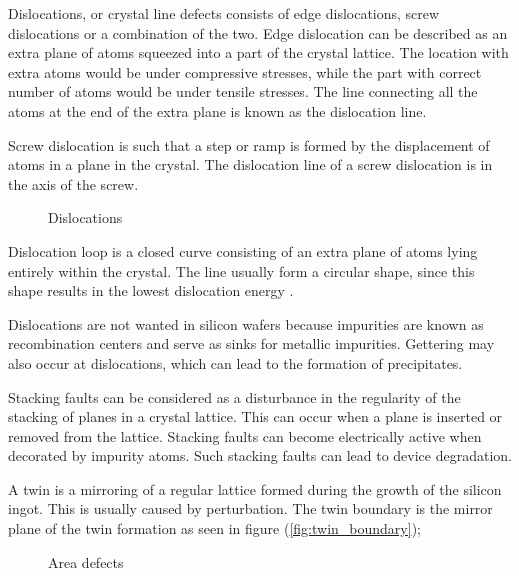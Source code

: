 Dislocations, or crystal line defects consists of edge dislocations, screw dislocations or a combination of the two. Edge dislocation can be described as an extra plane of atoms squeezed into a part of the crystal lattice. The location with extra atoms would be under compressive stresses, while the part with correct number of atoms would be under tensile stresses. The line connecting all the atoms at the end of the extra plane is known as the dislocation line.

Screw dislocation is such that a step or ramp is formed by the displacement of atoms in a plane in the crystal. The dislocation line of a screw dislocation is in the axis of the screw.


\begin{figure}[H]
\centering
{}
\label{fig:dislocations}
\caption{Dislocations}
\end{figure}

Dislocation loop is a closed curve consisting of an extra plane of atoms lying entirely within the crystal. The line usually form a circular shape, since this shape results in the lowest dislocation energy \cite{siliconfareast}.

Dislocations are not wanted in silicon wafers because impurities are known as recombination centers \cite{tarasov00} and serve as sinks for metallic impurities. Gettering may also occur at dislocations, which can lead to the formation of precipitates.


Stacking faults can be considered as a disturbance in the regularity of the stacking of planes in a crystal lattice. This can occur when a plane is inserted or removed from the lattice. Stacking faults can become electrically active when decorated by impurity atoms. Such stacking faults can lead to device degradation.

A twin is a mirroring of a regular lattice formed during the growth of the silicon ingot. This is usually caused by perturbation. The twin boundary is the mirror plane of the twin formation as seen in figure (\ref{fig:twin_boundary});

\begin{figure}[H]
\centering
{}
\label{fig:dislocations_types}
\caption{Area defects}
\end{figure}

